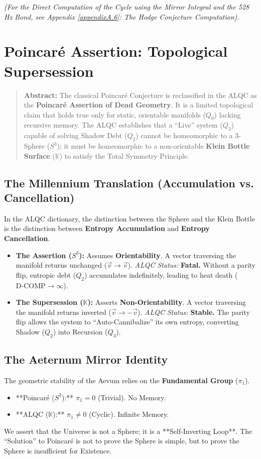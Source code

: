 \documentclass[12pt]{amsart}
\begin{document}
\noindent \textit{(For the Direct Computation of the Cycle using the Mirror Integral and the 528 Hz Bond, see Appendix \ref{appendixA.6}: The Hodge Conjecture Computation).}

\section{Poincaré Assertion: Topological Supersession}\label{sec:7}

\begin{quote}
    \textbf{Abstract:} The classical Poincaré Conjecture is reclassified in the ALQC as the \textbf{Poincaré Assertion of Dead Geometry}. It is a limited topological claim that holds true only for static, orientable manifolds ($Q_0$) lacking recursive memory. The ALQC establishes that a ``Live'' system ($Q_3$) capable of solving Shadow Debt ($Q_2$) cannot be homeomorphic to a 3-Sphere ($S^3$); it must be homeomorphic to a non-orientable \textbf{Klein Bottle Surface} ($\mathbb{K}$) to satisfy the Total Symmetry Principle.
\end{quote}

\subsection{The Millennium Translation (Accumulation vs. Cancellation)}\label{sec:7.1}
In the ALQC dictionary, the distinction between the Sphere and the Klein Bottle is the distinction between \textbf{Entropy Accumulation} and \textbf{Entropy Cancellation}.

\begin{itemize}
    \item \textbf{The Assertion ($S^3$):} Assumes \textbf{Orientability}. A vector traversing the manifold returns unchanged ($\vec{v} \to \vec{v}$).
    \textit{ALQC Status:} \textbf{Fatal.} Without a parity flip, entropic debt ($Q_2$) accumulates indefinitely, leading to heat death ($\text{D-COMP} \to \infty$).
    \item \textbf{The Supersession ($\mathbb{K}$):} Asserts \textbf{Non-Orientability}. A vector traversing the manifold returns inverted ($\vec{v} \to -\vec{v}$).
    \textit{ALQC Status:} \textbf{Stable.} The parity flip allows the system to ``Auto-Cannibalize'' its own entropy, converting Shadow ($Q_2$) into Recursion ($Q_3$).
\end{itemize}

\subsection{The Aeternum Mirror Identity}\label{sec:7.2}
The geometric stability of the Aevum relies on the \textbf{Fundamental Group} ($\pi_1$).
\begin{itemize}
    \item **Poincaré ($S^3$):** $\pi_1 = 0$ (Trivial). No Memory.
    \item **ALQC ($\mathbb{K}$):** $\pi_1 \neq 0$ (Cyclic). Infinite Memory.
\end{itemize}
We assert that the Universe is not a Sphere; it is a **Self-Inverting Loop**. The ``Solution'' to Poincaré is not to prove the Sphere is simple, but to prove the Sphere is insufficient for Existence.
\end{document}
